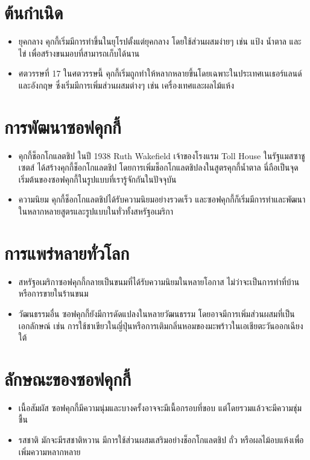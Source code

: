 \documentclass{report}
\begin{document}
\section{ต้นกำเนิด}	\par
\begin{itemize} 
	\item ยุคกลาง คุกกี้เริ่มมีการทำขึ้นในยุโรปตั้งแต่ยุคกลาง โดยใช้ส่วนผสมง่ายๆ เช่น แป้ง น้ำตาล และไข่ เพื่อสร้างขนมอบที่สามารถเก็บได้นาน
	\item ศตวรรษที่ 17 ในศตวรรษนี้ คุกกี้เริ่มถูกทําให้หลากหลายขึ้นโดยเฉพาะในประเทศเนเธอร์แลนด์และอังกฤษ ซึ่งเริ่มมีการเพิ่มส่วนผสมต่างๆ เช่น เครื่องเทศและผลไม้แห้ง
\end{itemize}
\section{การพัฒนาซอฟคุกกี้}	\par
\begin{itemize}
	\item คุกกี้ช็อกโกแลตชิป ในปี 1938 Ruth Wakefield เจ้าของโรงแรม Toll House ในรัฐแมสซาชูเซตส์ ได้สร้างคุกกี้ช็อกโกแลตชิป โดยการเพิ่มช็อกโกแลตชิปลงในสูตรคุกกี้น้ำตาล นี่ถือเป็นจุดเริ่มต้นของซอฟคุกกี้ในรูปแบบที่เรารู้จักกันในปัจจุบัน
	\item ความนิยม คุกกี้ช็อกโกแลตชิปได้รับความนิยมอย่างรวดเร็ว และซอฟคุกกี้ก็เริ่มมีการทำและพัฒนาในหลากหลายสูตรและรูปแบบในทั่วทั้งสหรัฐอเมริกา
\end{itemize}
\section{การแพร่หลายทั่วโลก} \par
\begin{itemize}
	\item สหรัฐอเมริกาซอฟคุกกี้กลายเป็นขนมที่ได้รับความนิยมในหลายโอกาส ไม่ว่าจะเป็นการทำที่บ้านหรือการขายในร้านขนม
	\item วัฒนธรรมอื่น ซอฟคุกกี้ยังมีการดัดแปลงในหลายวัฒนธรรม โดยอาจมีการเพิ่มส่วนผสมที่เป็นเอกลักษณ์ เช่น การใช้ชาเขียวในญี่ปุ่นหรือการเติมกลิ่นหอมของมะพร้าวในเอเชียตะวันออกเฉียงใต้
\end{itemize}
\section{ลักษณะของซอฟคุกกี้} \par
\begin{itemize}
	\item เนื้อสัมผัส ซอฟคุกกี้มีความนุ่มและบางครั้งอาจจะมีเนื้อกรอบที่ขอบ แต่โดยรวมแล้วจะมีความชุ่มชื้น
	\item รสชาติ มักจะมีรสชาติหวาน มีการใช้ส่วนผสมเสริมอย่างช็อกโกแลตชิป ถั่ว หรือผลไม้อบแห้งเพื่อเพิ่มความหลากหลาย
\end{itemize}
\end{document}
